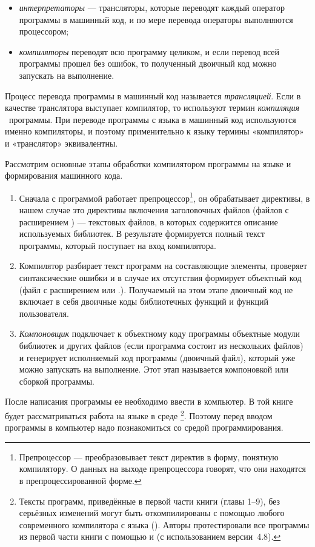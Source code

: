 \begin{itemize}
\item {}\emph{интерпретаторы} --- трансляторы, которые переводят 
каждый оператор программы в машинный код, и по мере перевода операторы
выполняются процессором; 
\item {}\emph{компиляторы} переводят всю программу целиком, и если 
перевод всей программы прошел без ошибок, то полученный двоичный код можно
запускать на выполнение. 
\end{itemize}
Процесс перевода программы в машинный код называется \emph{трансляцией}. 
Если в качестве транслятора выступает компилятор, то используют термин \emph{компиляция}%
~программы. При переводе программы с языка  в машинный код используются именно 
компиляторы, и поэтому применительно к
языку  термины «компилятор» и «транслятор» эквивалентны.

Рассмотрим основные этапы обработки компилятором программы на языке  и формирования машинного кода.

\begin{enumerate}
\item Сначала с программой работает препроцессор\footnote{Препроцессор --- преобразовывает
текст директив в форму, понятную компилятору. О данных на выходе препроцессора говорят, что они находятся
в препроцессированной форме.}, он обрабатывает директивы, в нашем случае это директивы включения
заголовочных файлов (файлов с расширением ) --- текстовых файлов, в которых содержится описание используемых
библиотек. В результате формируется полный текст программы, который поступает на вход компилятора. 
\item Компилятор разбирает текст программ на составляющие элементы, проверяет синтаксические ошибки и в случае их
отсутствия формирует объектный код (файл с расширением  или .). Получаемый на этом этапе
двоичный код не включает в себя двоичные коды библиотечных функций и функций пользователя.
\item \emph{Компоновщик} подключает к объектному коду программы объектные модули библиотек и других 
файлов (если программа состоит из нескольких
файлов) и генерирует исполняемый код программы (двоичный файл), который уже можно запускать на выполнение. Этот этап
называется компоновкой или сборкой программы.
\end{enumerate}

После написания программы ее необходимо ввести в компьютер. В той книге будет рассматриваться работа на языке  в
среде \footnote{Тексты программ, приведённые в первой части книги (главы 1--9), без серьёзных изменений
могут быть откомпилированы с помощью любого современного компилятора с языка (). Авторы протестировали все
программы из первой части книги с помощью   и   (с использованием  версии~4.8).}. 
Поэтому перед
вводом программы в компьютер надо познакомиться со средой программирования.

